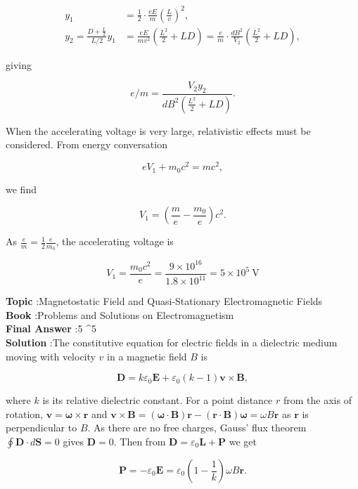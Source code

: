 \documentclass[10pt]{article}
\begin{document}
$$
\begin{aligned}
y_{1} &=\frac{1}{2} \cdot \frac{e E}{m}\left(\frac{L}{v}\right)^{2}, \\
y_{2}=\frac{D+\frac{L}{2}}{L / 2} y_{1} &=\frac{e E}{m v^{2}}\left(\frac{L^{2}}{2}+L D\right)=\frac{e}{m} \cdot \frac{d B^{2}}{V_{2}}\left(\frac{L^{2}}{2}+L D\right),
\end{aligned}
$$

giving

$$
e / m=\frac{V_{2} y_{2}}{d B^{2}\left(\frac{L^{2}}{2}+L D\right)} .
$$

 When the accelerating voltage is very large, relativistic effects must be considered. From energy conversation

$$
e V_{1}+m_{0} c^{2}=m c^{2},
$$

we find

$$
V_{1}=\left(\frac{m}{e}-\frac{m_{0}}{e}\right) c^{2} .
$$

As $\frac{e}{m}=\frac{1}{2} \frac{e}{m_{0}}$, the accelerating voltage is

$$
V_{1}=\frac{m_{0} c^{2}}{e}=\frac{9 \times 10^{16}}{1.8 \times 10^{11}}=5 \times 10^{5} \mathrm{~V}
$$

\textbf{Topic} :Magnetostatic Field and Quasi-Stationary Electromagnetic Fields\\
\textbf{Book} :Problems and Solutions on Electromagnetism\\
\textbf{Final Answer} :5 ^{5} \\


\textbf{Solution} :The constitutive equation for electric fields in a dielectric medium moving with velocity $v$ in a magnetic field $B$ is

$$
\mathbf{D}=k \varepsilon_{0} \mathbf{E}+\varepsilon_{0}(k-1) \mathbf{v} \times \mathbf{B},
$$

where $k$ is its relative dielectric constant. For a point distance $r$ from the axis of rotation, $\mathbf{v}=\boldsymbol{\omega} \times \mathbf{r}$ and $\mathbf{v} \times \mathbf{B}=(\boldsymbol{\omega} \cdot \mathbf{B}) \mathbf{r}-(\mathbf{r} \cdot \mathbf{B}) \boldsymbol{\omega}=\omega B \mathbf{r}$ as $\mathbf{r}$ is perpendicular to $B$. As there are no free charges, Gauss' flux theorem $\oint \mathbf{D} \cdot d \mathbf{S}=0$ gives $\mathbf{D}=0$. Then from $\mathbf{D}=\varepsilon_{0} \mathbf{L}+\mathbf{P}$ we get

$$
\mathbf{P}=-\varepsilon_{0} \mathbf{E}=\varepsilon_{0}\left(1-\frac{1}{k}\right) \omega B \mathbf{r} .
$$
\end{document}
